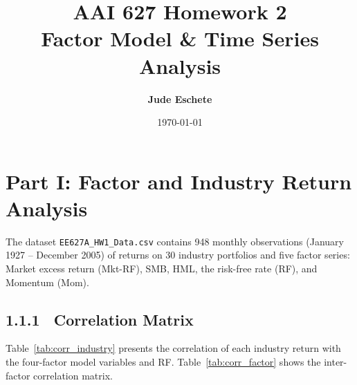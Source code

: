 \documentclass[12pt]{article}
\title{\textbf{AAI 627 Homework 2\\Factor Model \& Time Series Analysis}}
\author{\textbf{Jude Eschete}}
\date{\today}
\begin{document}
	
	\maketitle
	\newpage
	
	\section{Part I: Factor and Industry Return Analysis}
	
	The dataset \texttt{EE627A\_HW1\_Data.csv} contains 948 monthly observations (January 1927 -- December 2005) of returns on 30 industry portfolios and five factor series: Market excess return (Mkt-RF), SMB, HML, the risk-free rate (RF), and Momentum (Mom).
	
	\subsection{1.1.1 \ Correlation Matrix}
	
	Table~\ref{tab:corr_industry} presents the correlation of each industry return with the four-factor model variables and RF. Table~\ref{tab:corr_factor} shows the inter-factor correlation matrix.
	
\end{document}
